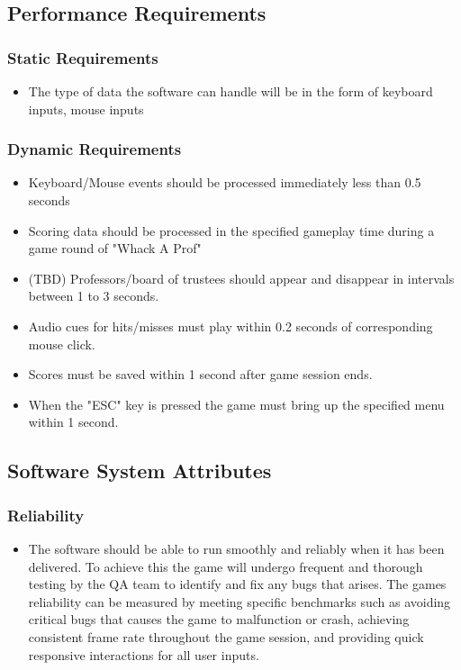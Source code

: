 \documentclass{article}
\begin{document}
\subsection{Performance Requirements}

\subsubsection{Static Requirements}
\begin{itemize}
    \item The type of data the software can handle will be in the form of keyboard inputs, mouse inputs 
\end{itemize}

\subsubsection{Dynamic Requirements}
\begin{itemize}
    \item Keyboard/Mouse events should be processed immediately less than 0.5 seconds 
    \item Scoring data should be processed in the specified gameplay time during a game round of "Whack A Prof"
    \item (TBD) Professors/board of trustees should appear and disappear in intervals between 1 to 3 seconds.
    \item Audio cues for hits/misses must play within 0.2 seconds of corresponding mouse click. 
    \item Scores must be saved within 1 second after game session ends.
    \item When the "ESC" key is pressed the game must bring up the specified menu within 1 second.

\end{itemize}


\subsection{Software System Attributes}

\subsubsection{Reliability}
\begin{itemize}
    \item The software should be able to run smoothly and reliably when it has been delivered. To achieve this the game will undergo frequent and thorough testing by the QA team to identify and fix any bugs that arises. 
    The games reliability can be measured by meeting specific benchmarks such as avoiding critical bugs that causes the game to malfunction or crash, achieving consistent frame rate throughout the game session, and providing quick responsive interactions for all user inputs. 
\end{itemize}
\end{document}
